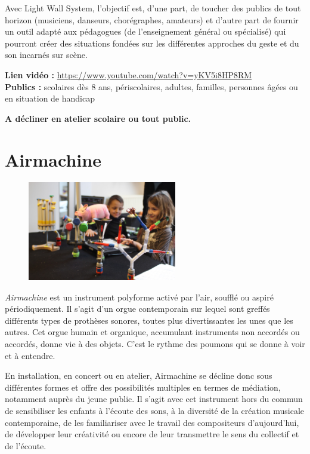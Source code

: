 \documentclass[fontsize=12pt]{scrartcl} %
\numberwithin{equation}{section} %
\numberwithin{table}{section} %
\begin{document}
Avec Light Wall System, l'objectif est, d'une part, de toucher des publics de tout horizon (musiciens, danseurs, chorégraphes, amateurs) et d'autre part de fournir un outil adapté aux pédagogues (de l'enseignement général ou spécialisé) qui pourront créer des situations fondées sur les différentes approches du geste et du son incarnés sur scène.

\noindent
\textbf{Lien vidéo :} \url{https://www.youtube.com/watch?v=yKV5i8HP8RM}\\

\noindent
\textbf{Publics :} scolaires dès 8 ans, périscolaires, adultes, familles, personnes âgées ou en situation de handicap

\noindent
\textbf{A décliner en atelier scolaire ou tout public.}

\pagebreak

\section{Airmachine}
\label{app:airmachine}

\begin{figure}
\centering
\includegraphics[width=6.5cm]{img/airmachine}
\label{fig:airmachine}
\end{figure}

\textit{Airmachine} est un instrument polyforme activé par l'air, soufflé ou aspiré périodiquement. Il s'agit d'un orgue contemporain sur lequel sont greffés différents types de prothèses sonores, toutes plus divertissantes les unes que les autres. Cet orgue humain et organique, accumulant instruments non accordés ou accordés, donne vie à des objets. C'est le rythme des poumons qui se donne à voir et à entendre.

En installation, en concert ou en atelier, Airmachine se décline donc sous différentes formes et offre des possibilités multiples en termes de médiation, notamment auprès du jeune public. Il s'agit avec cet instrument hors du commun de sensibiliser les enfants à l'écoute des sons, à la diversité de la création musicale contemporaine, de les familiariser avec le travail des compositeurs d'aujourd'hui, de développer leur créativité ou encore de leur transmettre le sens du collectif et de l'écoute.
\end{document}
